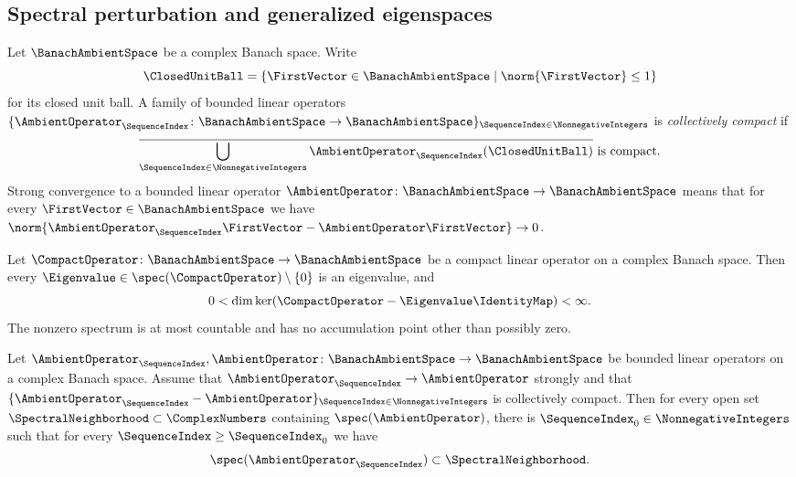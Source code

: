 \subsection{Spectral perturbation and generalized eigenspaces}\label{subsec:spectral-preliminaries-perturbation}
Let
$\BanachAmbientSpace$
be a complex Banach space.
Write
\[
 \ClosedUnitBall=\{\FirstVector\in\BanachAmbientSpace\mid\norm{\FirstVector}\leq1\}
\]
for its closed unit ball.
A family of bounded linear operators
$\{\AmbientOperator_\SequenceIndex\colon\BanachAmbientSpace\to\BanachAmbientSpace\}_{\SequenceIndex\in\NonnegativeIntegers}$
is \emph{collectively compact} if
\[
 \overline{\bigcup_{\SequenceIndex\in\NonnegativeIntegers}
 \AmbientOperator_\SequenceIndex(\ClosedUnitBall)}
 \text{ is compact}.
\]
Strong convergence to a bounded linear operator
$\AmbientOperator\colon\BanachAmbientSpace\to\BanachAmbientSpace$
means that for every
$\FirstVector\in\BanachAmbientSpace$
we have
$\norm{\AmbientOperator_\SequenceIndex\FirstVector-\AmbientOperator\FirstVector}\to0$.

\begin{theorem}\label{thm:compact-spectrum}
Let
$\CompactOperator\colon\BanachAmbientSpace\to\BanachAmbientSpace$
be a compact linear operator on a complex Banach space.
Then every
$\Eigenvalue\in\spec(\CompactOperator)\setminus\{0\}$
is an eigenvalue,
and
\[
 0<\dim\ker(\CompactOperator-\Eigenvalue\IdentityMap)<\infty.
\]
The nonzero spectrum is at most countable and has no accumulation point
other than possibly zero.
\end{theorem}

\begin{theorem}\label{thm:spectral-inclusion}
Let
$\AmbientOperator_\SequenceIndex,\AmbientOperator\colon\BanachAmbientSpace\to\BanachAmbientSpace$
be bounded linear operators on a complex Banach space.
Assume that
$\AmbientOperator_\SequenceIndex\to\AmbientOperator$
strongly and that
$\{\AmbientOperator_\SequenceIndex-\AmbientOperator\}_{\SequenceIndex\in\NonnegativeIntegers}$
is collectively compact.
Then for every open set
$\SpectralNeighborhood\subset\ComplexNumbers$
containing
$\spec(\AmbientOperator)$,
there is
$\SequenceIndex_0\in\NonnegativeIntegers$
such that for every
$\SequenceIndex\geq\SequenceIndex_0$
we have
\[
 \spec(\AmbientOperator_\SequenceIndex)\subset\SpectralNeighborhood.
\]
\end{theorem}

